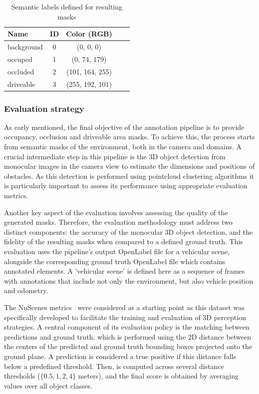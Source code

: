 \begin{table}[h]
    \centering
    \begin{tabular}{l c c c c}
        \toprule
        \textbf{Name} & \textbf{ID} & \textbf{Color (RGB)} \\
        \midrule
        background  & 0 & (0, 0, 0)         \\
        occuped     & 1 & (0, 74, 179)      \\
        occluded    & 2 & (101, 164, 255)   \\
        driveable   & 3 & (255, 192, 101)   \\

        \bottomrule
    \end{tabular}
    \caption{Semantic labels defined for resulting masks}
    \label{tab:occ2_labels}
\end{table}

\subsubsection{Evaluation strategy}
As early mentioned, the final objective of the annotation pipeline is to provide occupancy, occlusion and driveable area masks. To achieve this, the process starts from semantic masks of the environment, both in the camera and  domains. A crucial intermediate step in this pipeline is the 3D object detection from monocular images in the camera view to estimate the dimensions and positions of obstacles. As this detection is performed using pointcloud clustering algorithms it is particularly important to assess its performance using appropriate evaluation metrics.

Another key aspect of the evaluation involves assessing the quality of the generated  masks. Therefore, the evaluation methodology must address two distinct components: the accuracy of the monocular 3D object detection, and the fidelity of the resulting  masks when compared to a defined ground truth. This evaluation uses the pipeline's output OpenLabel file for a vehicular scene, alongside the corresponding ground truth OpenLabel file which contains annotated elements. A 'vehicular scene' is defined here as a sequence of frames with annotations that include not only the environment, but also vehicle position and odometry.

 \label{sec:3d_det_evaluation}

The NuScenes metrics~\cite{nuscenes} were considered as a starting point as this dataset was specifically developed to facilitate the training and evaluation of 3D perception strategies. A central component of its evaluation policy is the matching between predictions and ground truth, which is performed using the 2D distance between the centers of the predicted and ground truth bounding boxes projected onto the ground plane. A prediction is considered a true positive if this distance falls below a predefined threshold. Then,  is computed across several distance thresholds ($\{0.5, 1, 2, 4\}$ meters), and the final  score is obtained by averaging  values over all object classes.

